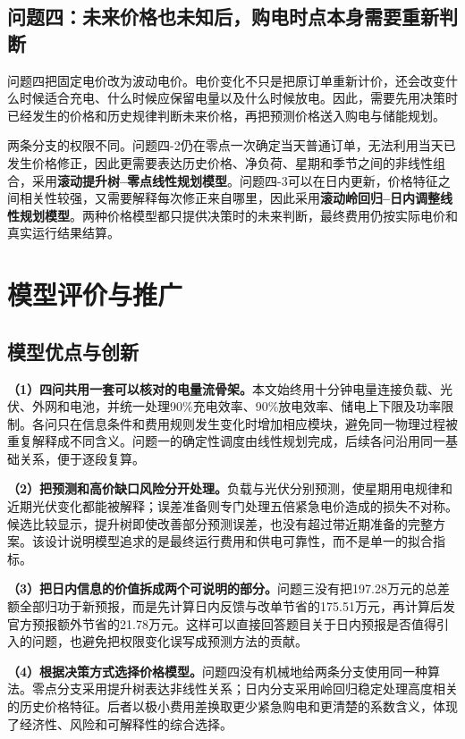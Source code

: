 \documentclass[11pt,a4paper]{article}
\begin{document}
\subsection{问题四：未来价格也未知后，购电时点本身需要重新判断}

问题四把固定电价改为波动电价。电价变化不只是把原订单重新计价，还会改变什么时候适合充电、什么时候应保留电量以及什么时候放电。因此，需要先用决策时已经发生的价格和历史规律判断未来价格，再把预测价格送入购电与储能规划。

两条分支的权限不同。问题四-2仍在零点一次确定当天普通订单，无法利用当天已发生价格修正，因此更需要表达历史价格、净负荷、星期和季节之间的非线性组合，采用\textbf{滚动提升树--零点线性规划模型}。问题四-3可以在日内更新，价格特征之间相关性较强，又需要解释每次修正来自哪里，因此采用\textbf{滚动岭回归--日内调整线性规划模型}。两种价格模型都只提供决策时的未来判断，最终费用仍按实际电价和真实运行结果结算。

\section{模型评价与推广}

\subsection{模型优点与创新}

\textbf{（1）四问共用一套可以核对的电量流骨架。}本文始终用十分钟电量连接负载、光伏、外网和电池，并统一处理90\%充电效率、90\%放电效率、储电上下限及功率限制。各问只在信息条件和费用规则发生变化时增加相应模块，避免同一物理过程被重复解释成不同含义。问题一的确定性调度由线性规划完成\cite{dantzig}，后续各问沿用同一基础关系，便于逐段复算。

\textbf{（2）把预测和高价缺口风险分开处理。}负载与光伏分别预测，使星期用电规律和近期光伏变化都能被解释\cite{hyndman}；误差准备则专门处理五倍紧急电价造成的损失不对称。候选比较显示，提升树即使改善部分预测误差，也没有超过带近期准备的完整方案。该设计说明模型追求的是最终运行费用和供电可靠性，而不是单一的拟合指标。

\textbf{（3）把日内信息的价值拆成两个可说明的部分。}问题三没有把197.28万元的总差额全部归功于新预报，而是先计算日内反馈与改单节省的175.51万元，再计算后发官方预报额外节省的21.78万元。这样可以直接回答题目关于日内预报是否值得引入的问题，也避免把权限变化误写成预测方法的贡献。

\textbf{（4）根据决策方式选择价格模型。}问题四没有机械地给两条分支使用同一种算法。零点分支采用提升树表达非线性关系\cite{friedman}；日内分支采用岭回归稳定处理高度相关的历史价格特征\cite{hoerl}。后者以极小费用差换取更少紧急购电和更清楚的系数含义，体现了经济性、风险和可解释性的综合选择。
\end{document}
